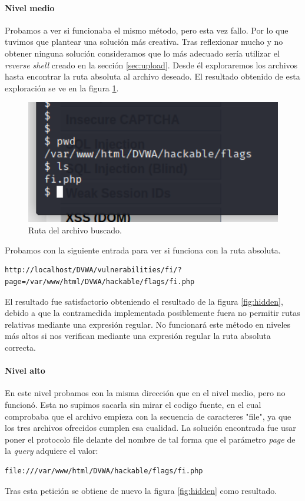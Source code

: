 \paragraph{Nivel medio} Probamos a ver si funcionaba el mismo método, pero esta vez fallo.
Por lo que tuvimos que plantear una solución más creativa. Tras reflexionar mucho y no obtener ninguna
solución consideramos que lo más adecuado sería utilizar el {\it reverse shell} creado 
en la sección \ref{sec:upload}. Desde él exploraremos los archivos hasta encontrar la ruta absoluta 
al archivo deseado. El resultado obtenido de esta exploración se ve en la figura \ref{fig:path}.
\begin{figure}[ht!]
    \centering
    \includegraphics[width=14cm]{img/inclusion/ruta.png}
    \caption{Ruta del archivo buscado.}
    \label{fig:path}
\end{figure}
Probamos con la siguiente entrada para ver si funciona con la ruta absoluta.
\begin{lstlisting}
http://localhost/DVWA/vulnerabilities/fi/?page=/var/www/html/DVWA/hackable/flags/fi.php
\end{lstlisting}
El resultado fue satisfactorio obteniendo el resultado de la figura \ref{fig:hidden}, debido a que la contramedida implementada posiblemente
fuera no permitir rutas relativas mediante una expresión regular. 
No funcionará este método en niveles más altos si nos verifican mediante una expresión
regular la ruta absoluta correcta.
\paragraph{Nivel alto} En este nivel probamos con la misma dirección que en el nivel medio, pero no funcionó.
Esta no supimos sacarla sin mirar el codigo fuente, en el cual comprobaba que el archivo empieza con la secuencia 
de caracteres "file", ya que los tres archivos ofrecidos cumplen esa cualidad. La solución encontrada fue 
usar poner el protocolo file delante del nombre de tal forma que el parámetro {\it page} de la {\it query} 
adquiere el valor:
\begin{lstlisting}
file:///var/www/html/DVWA/hackable/flags/fi.php
\end{lstlisting}
Tras esta petición se obtiene  de nuevo la figura \ref{fig:hidden} como resultado.